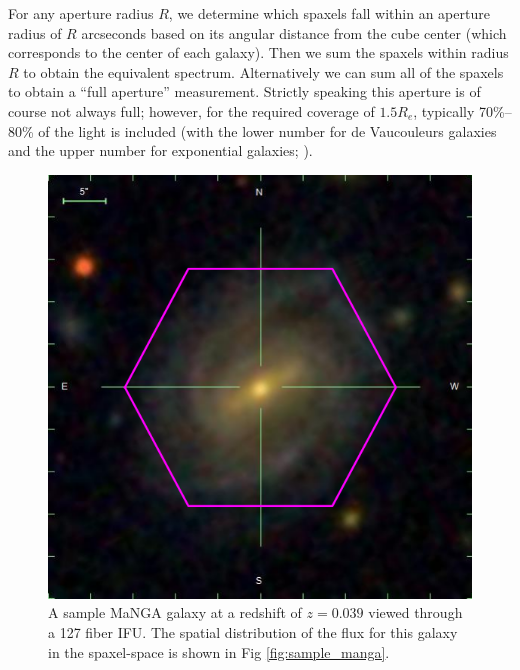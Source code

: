 For any aperture radius $R$, we determine which 
spaxels fall within an aperture radius of $R$ 
arcseconds based on its angular distance from the 
cube center (which corresponds to the center of 
each galaxy). Then we sum the spaxels within radius $R$ 
to obtain the equivalent spectrum. Alternatively we 
can sum all of the spaxels to obtain a ``full aperture''
measurement. Strictly speaking this aperture is of
course not always full; however, for the required
coverage of $1.5R_e$, typically 70\%--80\% of the 
light is included (with the lower number for de Vaucouleurs
galaxies and the upper number for exponential galaxies;
\citealt{graham05a}).



\begin{figure}
\includegraphics[width=\textwidth]{figures/manga_9890_12702}
\caption[A sample MaNGA galaxy  at a redshift of $z = 0.039$ viewed 
through a 127 fiber IFU. The spatial distribution of the flux for this galaxy in 
the spaxel-space is shown in Fig \ref{fig:sample_manga}.]
{A sample MaNGA galaxy  at a redshift of $z = 0.039$ viewed 
through a 127 fiber IFU. The spatial distribution of the flux for this galaxy in 
the spaxel-space is shown in Fig \ref{fig:sample_manga}.
\label{fig:sample_manga0}}
\end{figure}

